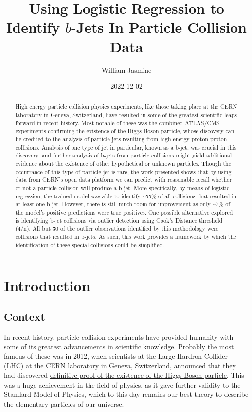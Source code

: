 \documentclass[
]{article}
\title{Using Logistic Regression to Identify \(b\)-Jets In Particle
Collision Data}
\author{William Jasmine}
\date{2022-12-02}
\begin{document}
\maketitle
\begin{abstract}
High energy particle collision physics experiments, like those taking
place at the CERN laboratory in Geneva, Switzerland, have resulted in
some of the greatest scientific leaps forward in recent history. Most
notable of these was the combined ATLAS/CMS experiments confirming the
existence of the Higgs Boson particle, whose discovery can be credited
to the analysis of particle jets resulting from high energy
proton-proton collisions. Analysis of one type of jet in particular,
known as a b-jet, was crucial in this discovery, and further analysis of
b-jets from particle collisions might yield additional evidence about
the existence of other hypothetical or unknown particles. Though the
occurrance of this type of particle jet is rare, the work presented
shows that by using data from CERN's open data platform we can predict
with reasonable recall whether or not a particle collision will produce
a b-jet. More specifically, by means of logistic regression, the trained
model was able to identify \textasciitilde55\% of all collisions that
resulted in at least one b-jet. However, there is still much room for
improvement as only \textasciitilde7\% of the model's positive
predictions were true positives. One possible alternative explored is
identifying b-jet collisions via outlier detection using Cook's Distance
threshold (4/n). All but 30 of the outlier observations identified by
this methodology were collisions that resulted in b-jets. As such, this
work provides a framework by which the identification of these special
collisions could be simplified.
\end{abstract}

\hypertarget{introduction}{%
\section{Introduction}\label{introduction}}

\hypertarget{context}{%
\subsection{Context}\label{context}}

In recent history, particle collision experiments have provided humanity
with some of its greatest advancements in scientific knowledge. Probably
the most famous of these was in 2012, when scientists at the Large
Hardron Collider (LHC) at the CERN laboratory in Geneva, Switzerland,
announced that they had discovered
\href{https://arxiv.org/abs/1207.7214}{definitive proof of the existence
of the Higgs Boson particle}. This was a huge achievement in the field
of physics, as it gave further validity to the Standard Model of
Physics, which to this day remains our best theory to describe the
elementary particles of our universe.
\end{document}
